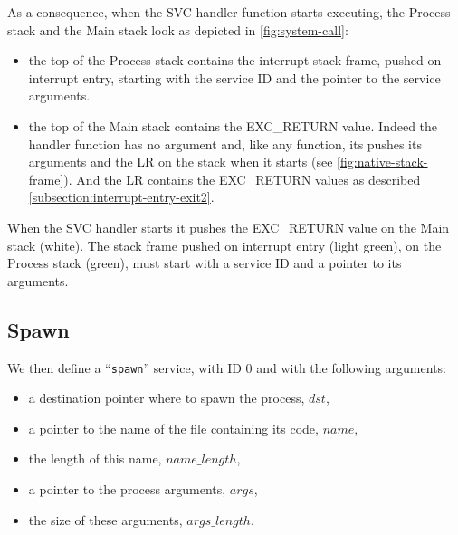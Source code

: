 As a consequence, when the SVC handler function starts executing, the Process
stack and the Main stack look as depicted in \cref{fig:system-call}:
\begin{itemize}
  \item the top of the Process stack contains the interrupt stack frame, pushed
  on interrupt entry, starting with the service ID and the pointer to the
  service arguments.

  \item the top of the Main stack contains the EXC\_RETURN value. Indeed the
  handler function has no argument and, like any function, its pushes its
  arguments and the LR on the stack when it starts (see
  \cref{fig:native-stack-frame}). And the LR contains the EXC\_RETURN values as
  described \cref{subsection:interrupt-entry-exit2}.
\end{itemize}

\begin{Figure}
  

  \caption{When the SVC handler starts it pushes the EXC\_RETURN value on the
  Main stack (white). The stack frame pushed on interrupt entry (light green),
  on the Process stack (green), must start with a service ID and a pointer
  to its arguments.}\label{fig:system-call}
\end{Figure}

\subsection{Spawn}\label{subsection:spawn}

We then define a ``{\tt spawn}'' service, with ID 0 and with the following
arguments:
\begin{itemize}
  \item a destination pointer where to spawn the process, $\mathit{dst}$,

  \item a pointer to the name of the file containing its code, $\mathit{name}$,

  \item the length of this name, $\mathit{name\_length}$,

  \item a pointer to the process arguments, $\mathit{args}$,

  \item the size of these arguments, $\mathit{args\_length}$.
\end{itemize}

